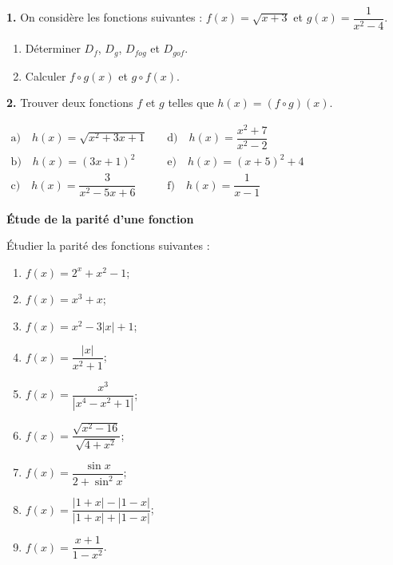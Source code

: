 \documentclass[12pt]{article}
\begin{document}
\bigskip

\noindent
\textbf{1.} On considère les fonctions suivantes :  
\( f(x) = \sqrt{x + 3} \) et \( g(x) = \dfrac{1}{x^2 - 4} \).

\begin{enumerate}
    \item Déterminer \( D_f \), \( D_g \), \( D_{fog} \) et \( D_{gof} \).
    \item Calculer \( f \circ g(x) \) et \( g \circ f(x) \).
\end{enumerate}

\bigskip

\noindent
\textbf{2.} Trouver deux fonctions \( f \) et \( g \) telles que  
\( h(x) = (f \circ g)(x) \).

\bigskip

\noindent
\(
\begin{array}{ll}
    \text{a)} \quad h(x) = \sqrt{x^2 + 3x + 1} & \quad
    \text{d)} \quad h(x) = \dfrac{x^2 + 7}{x^2 - 2} \\
    \text{b)} \quad h(x) = (3x + 1)^2 & \quad
    \text{e)} \quad h(x) = (x + 5)^2 + 4 \\
    \text{c)} \quad h(x) = \dfrac{3}{x^2 - 5x + 6} & \quad
    \text{f)} \quad h(x) = \dfrac{1}{x - 1}
\end{array}
\)

 \quad \textbf{Étude de la parité d’une fonction}

\bigskip

Étudier la parité des fonctions suivantes :

\begin{enumerate}
    \item \( f(x) = 2^x + x^2 - 1 \);
    \item \( f(x) = x^3 + x \);
    \item \( f(x) = x^2 - 3|x| + 1 \);
    \item \( f(x) = \dfrac{|x|}{x^2 + 1} \);
    \item \( f(x) = \dfrac{x^3}{|x^4 - x^2 + 1|} \);
    \item \( f(x) = \dfrac{\sqrt{x^2 - 16}}{\sqrt{4 + x^2}} \);
    \item \( f(x) = \dfrac{\sin x}{2 + \sin^2 x} \);
    \item \( f(x) = \dfrac{|1 + x| - |1 - x|}{|1 + x| + |1 - x|} \);
    \item \( f(x) = \dfrac{x + 1}{1 - x^2} \).
\end{enumerate}

\end{document}

